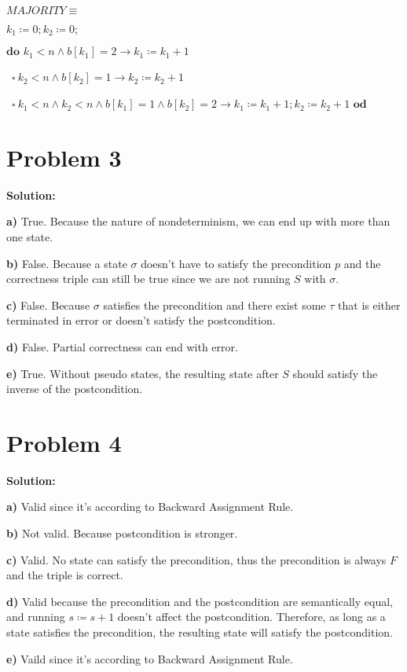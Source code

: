 \documentclass{article}
\begin{document}
\qquad $MAJORITY \equiv$

\qquad \qquad $k_1 \coloneqq 0; k_2 \coloneqq 0;$

\qquad \qquad $\textbf{do } k_1<n \wedge b[k_1]=2 \rightarrow k_1 \coloneqq k_1+1$

\qquad \qquad \ $\square \ k_2<n \wedge b[k_2]=1 \rightarrow k_2 \coloneqq k_2+1$

\qquad \qquad \ $\square \ k_1<n \wedge k_2<n \wedge b[k_1]=1 \wedge b[k_2]=2 \rightarrow k_1 \coloneqq k_1+1; k_2 \coloneqq k_2+1 \textbf{ od}$

\section*{Problem 3}
\textbf{Solution:}

\textbf{a)} True. Because the nature of nondeterminism, we can end up with more than one state.

\textbf{b)} False. Because a state $\sigma$ doesn't have to satisfy the precondition $p$ and the correctness triple can still be true since we are not running $S$ with $\sigma$.

\textbf{c)} False. Because $\sigma$ satisfies the precondition and there exist some $\tau$ that is either terminated in error or doesn't satisfy the postcondition.

\textbf{d)} False. Partial correctness can end with error.

\textbf{e)} True. Without pseudo states, the resulting state after $S$ should satisfy the inverse of the postcondition.

\section*{Problem 4}
\textbf{Solution:}

\textbf{a)} Valid since it's according to Backward Assignment Rule.

\textbf{b)} Not valid. Because postcondition is stronger.

\textbf{c)} Valid. No state can satisfy the precondition, thus the precondition is always $F$ and the triple is correct.

\textbf{d)} Valid because the precondition and the postcondition are semantically equal, and running $s \coloneqq s+1$ doesn't affect the postcondition. Therefore, as long as a state satisfies the precondition, the resulting state will satisfy the postcondition.

\textbf{e)} Vaild since it's according to Backward Assignment Rule.
\end{document}
